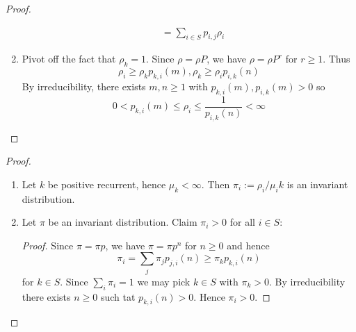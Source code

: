 \documentclass[a4paper]{article}
\begin{document}
\begin{proof}
\begin{enumerate}
\begin{align*}
             &= \sum_{i \in S}^{ }p_{i,j} \rho_i
    \end{align*}
  \item Pivot off the fact that \(\rho_k = 1\). Since \(\rho = \rho P\), we have \(\rho = \rho P^r\) for \(r \geq 1\). Thus
    \[
      \rho_i \geq \rho_k p_{k, i}(m), \rho_k \geq \rho_i p_{i, k}(n)
    \]
    By irreducibility, there exists \(m, n \geq 1\) with \(p_{k, i}(m), p_{i, k}(m) > 0\) so
    \[
      0 < p_{k, i}(m) \leq \rho_i \leq \frac{1}{p_{i, k}(n)} < \infty
    \]
  \end{enumerate}
\end{proof}

\begin{proof}\leavevmode
  \begin{enumerate}
  \item Let \(k\) be positive recurrent, hence \(\mu_k < \infty\). Then \(\pi_i := \rho_i/\mu_ik\) is an invariant distribution.
  \item Let \(\pi\) be an invariant distribution. Claim \(\pi_i > 0\) for all \(i \in S\):
    \begin{proof}
      Since \(\pi = \pi p\), we have \(\pi = \pi p^n\) for \(n \geq 0\) and hence
      \[
        \pi_i = \sum_j \pi_j p_{j,i}(n) \geq \pi_k p_{k,i}(n)
      \]
      for \(k \in S\). Since \(\sum_i \pi_i = 1\) we may pick \(k \in S\) with \(\pi_k > 0\). By irreducibility there exists \(n \geq 0\) such tat \(p_{k, i}(n) > 0\). Hence \(\pi_i > 0\).


\end{proof}
\end{enumerate}
\end{proof}
\end{document}
